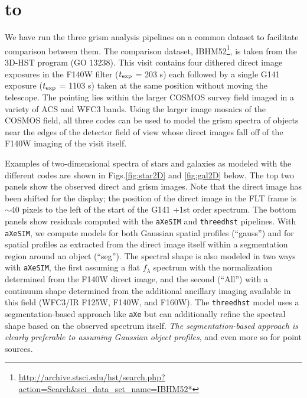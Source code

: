 \documentclass[12pt]{article}
\def\ssection#1{\section{\hbox to \hsize{\large\bf #1\hfill}}}
\begin{document}
\ssection{Example comparison}

We have run the three grism analysis pipelines on a common dataset to facilitate comparison between them.  The comparison dataset, IBHM52\footnote{\url{http://archive.stsci.edu/hst/search.php?action=Search&sci_data_set_name=IBHM52*}}, is taken from the 3D-HST program (GO 13238).  This visit contains four dithered direct image exposures in the F140W filter ($t_{\rm exp}$ = 203 s) each followed by a single G141 exposure ($t_{\rm exp}$ = 1103 s) taken at the same position without moving the telescope.  The pointing lies within the larger COSMOS survey field imaged in a variety of ACS and WFC3 bands.  Using the larger image mosaics of the COSMOS field, all three codes can be used to model the grism spectra of objects near the edges of the detector field of view whose direct images fall off of the F140W imaging of the visit itself.
    
    Examples of two-dimensional spectra of stars and galaxies as modeled with the different codes are shown in Figs.\ref{fig:star2D} and \ref{fig:gal2D} below.  The top two panels show the observed direct and grism images.  Note that the direct image has been shifted for the display; the position of the direct image in the FLT frame is $\sim$40 pixels to the left of the start of the G141 +1st order spectrum.  The bottom panels show residuals computed with the \texttt{aXeSIM} and \texttt{threedhst} pipelines.  With \texttt{aXeSIM}, we compute models for both Gaussian spatial profiles (``gauss'') and for spatial profiles as extracted from the direct image itself within a segmentation region around an object (``seg'').  The spectral shape is also modeled in two ways with \texttt{aXeSIM}, the first assuming a flat $f_\lambda$ spectrum with the normalization determined from the F140W direct image, and the second (``All'') with a continuum shape determined from the additional ancillary imaging available in this field (WFC3/IR F125W, F140W, and F160W).  The \texttt{threedhst} model uses a segmentation-based approach like \texttt{aXe} but can additionally refine the spectral shape based on the observed spectrum itself.  \textit{The segmentation-based approach is clearly preferable to assuming Gaussian object profiles}, and even more so for point sources.  
    
\end{document}
